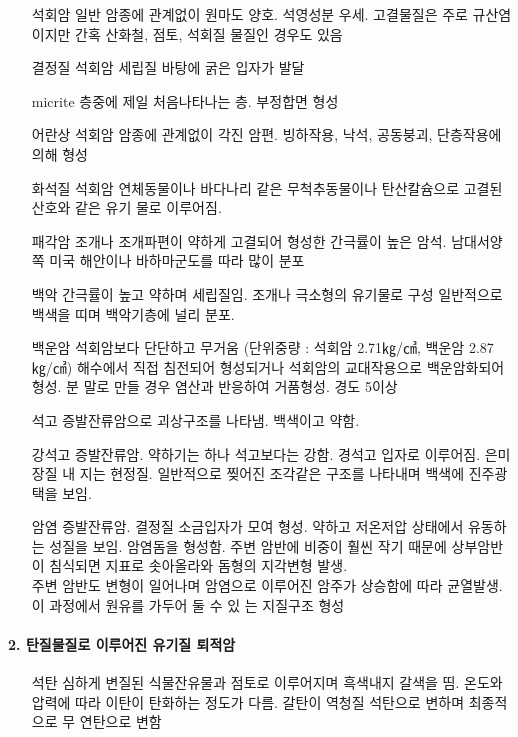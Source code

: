 \documentclass[12pt, a4paper, twoside]{book}
\begin{document}
			\begin{itemize}[topsep=0.0em, parsep=0.0em, itemsep=0em, leftmargin=10.0em, labelwidth=3em, labelsep=3em] 
			\item [석회암 일반]	암종에 관계없이 원마도 양호. 석영성분 우세. 고결물질은 주로 규산염이지만 간혹    산화철, 점토, 석회질 물질인 경우도 있음 
			\item [결정질 석회암]	세립질 바탕에 굵은 입자가 발달
			\item [micrite] 		층중에 제일 처음나타나는 층. 부정합면 형성
			\item [어란상 석회암]	암종에 관계없이 각진 암편. 빙하작용, 낙석, 공동붕괴, 단층작용에 의해 형성
			\item [화석질 석회암]	연체동물이나 바다나리 같은 무척추동물이나 탄산칼슘으로 고결된 산호와 같은 유기   물로 이루어짐. 
			\item [패각암]			조개나 조개파편이 약하게 고결되어 형성한 간극률이 높은 암석. 남대서양 쪽 미국   해안이나 바하마군도를 따라 많이 분포
			\item [백악]			간극률이 높고 약하며 세립질임. 조개나 극소형의 유기물로 구성 일반적으로 백색을   띠며 백악기층에 널리 분포.
			\item [백운암]			석회암보다 단단하고 무거움 (단위중량 : 석회암 2.71㎏/㎤, 백운암 2.87㎏/㎤)
								해수에서 직접 침전되어 형성되거나 석회암의 교대작용으로 백운암화되어 형성. 분   말로 만들 경우 염산과 반응하여 거품형성. 경도 5이상
			\item [석고]	 		증발잔류암으로 괴상구조를 나타냄. 백색이고 약함.
			\item [강석고]			 증발잔류암. 약하기는 하나 석고보다는 강함. 경석고 입자로 이루어짐. 은미장질 내   지는 현정질. 일반적으로 찢어진 조각같은 구조를 나타내며 백색에 진주광택을 보임.
			\item [암염]			증발잔류암. 결정질 소금입자가 모여 형성. 약하고 저온저압 상태에서 유동하는 성질을 보임. 
								암염돔을 형성함. 
								주변 암반에 비중이 훨씬 작기 때문에 상부암반이 침식되면 지표로 솟아올라와 돔형의 지각변형 발생. \\
								주변 암반도 변형이 일어나며 암염으로 이루어진 암주가 상승함에 따라 균열발생. \\
								이 과정에서 원유를 가두어 둘 수 있   는 지질구조 형성
			\end{itemize}
 
		\paragraph{2. 탄질물질로 이루어진 유기질 퇴적암}
			\begin{itemize}[topsep=0.0em, parsep=0.0em, itemsep=0em, leftmargin=10.0em, labelwidth=3em, labelsep=3em] 
			\item [석탄]			심하게 변질된 식물잔유물과 점토로 이루어지며 흑색내지 갈색을 띰. 온도와 압력에   따라 이탄이 탄화하는 정도가 다름. 갈탄이 역청질 석탄으로 변하며 최종적으로 무   연탄으로 변함
			\end{itemize}
\end{document}
